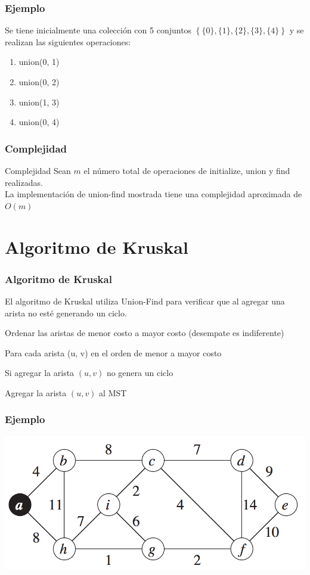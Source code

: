 \documentclass{beamer}
\begin{document}
	\begin{frame}[fragile]
		\frametitle{Ejemplo}
		Se tiene inicialmente una colección con 5 conjuntos $\left\{\{0\}, \{1\}, \{2\}, \{3\}, \{4\}\right\}$ y se realizan las siguientes operaciones:
		\begin{enumerate}
			\item union(0, 1)
			\item union(0, 2)
			\item union(1, 3)
			\item union(0, 4)
		\end{enumerate}
	\end{frame}
	
	\begin{frame}
		\frametitle{Complejidad}
		\begin{block}{Complejidad}
			Sean $m$ el número total de operaciones de initialize, union y find realizadas.\\
			La implementación de union-find mostrada tiene una complejidad aproximada de $O(m)$
		\end{block}
	\end{frame}

\section[Kruskal]{Algoritmo de Kruskal}
	\begin{frame}
		\frametitle{Algoritmo de Kruskal}
		El algoritmo de Kruskal utiliza Union-Find para verificar que al agregar una arista no esté generando un ciclo.
		\begin{enumerate}
			\item Ordenar las aristas de menor costo a mayor costo (desempate es indiferente)
			\item Para cada arista (u, v) en el orden de menor a mayor costo
			{\setlength\itemindent{15pt} \item Si agregar la arista $(u, v)$ no genera un ciclo}
			{\setlength\itemindent{30pt} \item Agregar la arista $(u, v)$ al MST}
		\end{enumerate}
	\end{frame}

	\begin{frame}
		\frametitle{Ejemplo}
		\includegraphics[width = \textwidth]{Ejemplo.png}
	\end{frame}
	
\end{document}
